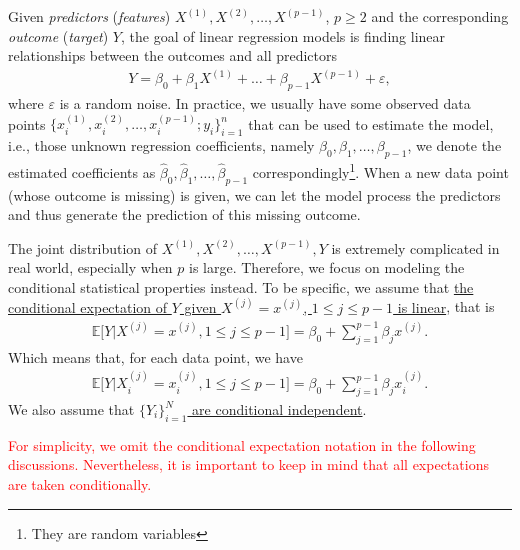 \documentclass{book}
\begin{document}
Given \textit{predictors} (\textit{features}) $X^{(1)}, X^{(2)}, \dots, X^{(p-1)}$, $p \geq 2$ and the corresponding \textit{outcome} (\textit{target}) $Y$, the goal of linear regression models is finding linear relationships between the outcomes and all predictors
\begin{align}
    Y = \beta_0 + \beta_1 X^{(1)} + \dots + \beta_{p-1} X^{(p-1)} +\varepsilon,
\end{align}
where $\varepsilon$ is a random noise. In practice, we usually have some observed data points $\{x_i^{(1)}, x_i^{(2)},\dots, x_i^{(p-1)}; y_i\}_{i=1}^{n}$ that can be used to estimate the model, i.e., those unknown regression coefficients, namely $\beta_0,\beta_1,\dots,\beta_{p-1}$, we denote the estimated coefficients as $\hat{\beta}_0,\hat{\beta}_1,\dots,\hat{\beta}_{p-1}$ correspondingly\footnote{They are random variables}. When a new data point (whose outcome is missing) is given, we can let the model process the predictors and thus generate the prediction of this missing outcome. 

The joint distribution of $X^{(1)}, X^{(2)},\dots, X^{(p-1)}, Y$ is extremely complicated in real world, especially when $p$ is large. Therefore, we focus on modeling the conditional statistical properties instead. To be specific, we assume that \ul{the conditional expectation of $Y$ given $X^{(j)} = x^{(j)}$, $1\leq j\leq p-1$ is linear}, that is
\begin{align}
    \mathbb{E}\big[Y | X^{(j)} = x^{(j)}, 1\leq j\leq p-1\big]
    =
    \beta_0 + \sum_{j=1}^{p-1} \beta_jx^{(j)}.
\end{align}
Which means that, for each data point, we have
\begin{align}
    \mathbb{E}\big[Y | X_i^{(j)} = x_i^{(j)}, 1\leq j\leq p-1\big]
    =
    \beta_0 + \sum_{j=1}^{p-1} \beta_jx_i^{(j)}.
\end{align}
We also assume that \ul{$\{Y_i\}_{i=1}^{N}$ are conditional independent}.

\textcolor{red}{For simplicity, we omit the conditional expectation notation in the following discussions. Nevertheless, it is important to keep in mind that all expectations are taken conditionally.}
\end{document}
